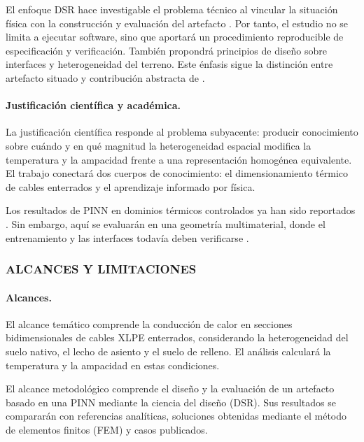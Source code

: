 El enfoque DSR hace investigable el problema técnico al vincular la situación física con la construcción y evaluación del artefacto \parencite[55--56]{peffers2007}. Por tanto, el estudio no se limita a ejecutar software, sino que aportará un procedimiento reproducible de especificación y verificación. También propondrá principios de diseño sobre interfaces y heterogeneidad del terreno. Este énfasis sigue la distinción entre artefacto situado y contribución abstracta de \textcite[342--350]{gregor2013}.

\paragraph{Justificación científica y académica.}

La justificación científica responde al problema subyacente: producir conocimiento sobre cuándo y en qué magnitud la heterogeneidad espacial modifica la temperatura y la ampacidad frente a una representación homogénea equivalente. El trabajo conectará dos cuerpos de conocimiento: el dimensionamiento térmico de cables enterrados y el aprendizaje informado por física.

Los resultados de PINN en dominios térmicos controlados ya han sido reportados \parencites[1--3,17]{xing2023}[1,3,16]{pan2025}. Sin embargo, aquí se evaluarán en una geometría multimaterial, donde el entrenamiento y las interfaces todavía deben verificarse \parencite[2--6]{ren2025}.

\subsubsection{ALCANCES Y LIMITACIONES}

\paragraph{Alcances.}

El alcance temático comprende la conducción de calor en secciones bidimensionales de cables XLPE enterrados, considerando la heterogeneidad del suelo nativo, el lecho de asiento y el suelo de relleno. El análisis calculará la temperatura y la ampacidad en estas condiciones.

El alcance metodológico comprende el diseño y la evaluación de un artefacto basado en una PINN mediante la ciencia del diseño (DSR). Sus resultados se compararán con referencias analíticas, soluciones obtenidas mediante el método de elementos finitos (FEM) y casos publicados.

